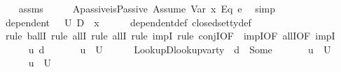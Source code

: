 \begin{isabellebody}
%
\isadelimproof
\ \ %
\endisadelimproof
%
\isatagproof
{}\isamarkupfalse%
\ assms\isanewline
{}\isamarkupfalse%
\ {\isacharminus}{\kern0pt}\isanewline
\ \ \isamarkupfalse%
\ Apassive{\isacharcolon}{\kern0pt}{\isachardoublequoteopen}isPassive\ {\isacharparenleft}{\kern0pt}Assume\ {\isacharparenleft}{\kern0pt}{\isacharparenleft}{\kern0pt}Var\ x{\isacharparenright}{\kern0pt}\ {\isasymguillemotleft}Eq{\isasymguillemotright}\ e{}{\isacharparenright}{\kern0pt}{\isacharparenright}{\kern0pt}{\isachardoublequoteclose}\ \isamarkupfalse%
\ simp\isanewline
\ \ \isamarkupfalse%
\ {\isachardoublequoteopen}dependent\ {\isasymLambda}\ {\isasymOmega}\ {\isacharquery}{\kern0pt}U{\isacharprime}{\kern0pt}\ {\isacharparenleft}{\kern0pt}D\ {\isasymunion}\ {\isacharbraceleft}{\kern0pt}x{\isacharbraceright}{\kern0pt}{\isacharparenright}{\kern0pt}{\isachardoublequoteclose}\isanewline
\ \ \ \ \isamarkupfalse%
\ dependent{\isacharunderscore}{\kern0pt}def\ closed{\isacharunderscore}{\kern0pt}set{\isacharunderscore}{\kern0pt}ty{\isacharunderscore}{\kern0pt}def\isanewline
\ \ \isamarkupfalse%
\ {\isacharparenleft}{\kern0pt}rule\ ballI{\isacharcomma}{\kern0pt}\ rule\ allI{\isacharcomma}{\kern0pt}\ rule\ allI{\isacharcomma}{\kern0pt}\ rule\ impI{\isacharcomma}{\kern0pt}\ rule\ conjI{\isacharbrackleft}{\kern0pt}OF\ {\isacharunderscore}{\kern0pt}\ impI{\isacharbrackleft}{\kern0pt}OF\ allI{\isacharbrackleft}{\kern0pt}OF\ impI{\isacharbrackright}{\kern0pt}{\isacharbrackright}{\kern0pt}{\isacharbrackright}{\kern0pt}{\isacharparenright}{\kern0pt}\isanewline
\ \ \ \ \isamarkupfalse%
\ u{\isacharprime}{\kern0pt}\ d\ {\isasymtau}\isanewline
\ \ \ \ \isamarkupfalse%
\ {\isachardoublequoteopen}u{\isacharprime}{\kern0pt}\ {\isasymin}\ {\isacharquery}{\kern0pt}U{\isacharprime}{\kern0pt}{\isachardoublequoteclose}\isanewline
\ \ \ \ \isamarkupfalse%
\ LookupD{\isacharcolon}{\kern0pt}{\isachardoublequoteopen}lookup{\isacharunderscore}{\kern0pt}var{\isacharunderscore}{\kern0pt}ty\ {\isasymLambda}\ d\ {\isacharequal}{\kern0pt}\ Some\ {\isasymtau}{\isachardoublequoteclose}\isanewline
\ \ \ \ \isamarkupfalse%
\ {\isachardoublequoteopen}u{\isacharprime}{\kern0pt}\ {\isasymin}\ {\isacharquery}{\kern0pt}U{\isacharprime}{\kern0pt}{\isachardoublequoteclose}\isanewline
\ \ \ \ \isamarkupfalse%
\ {\isachardoublequoteopen}u{\isacharprime}{\kern0pt}\ {\isasymin}\ U{\isachardoublequoteclose}\ \isamarkupfalse%

\end{isabellebody}
